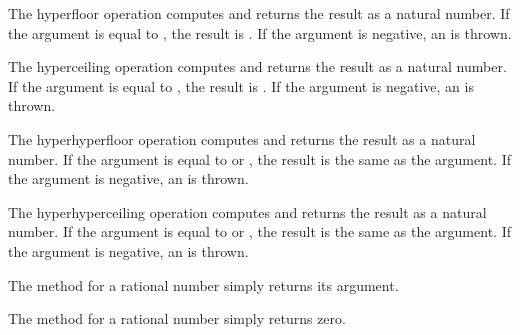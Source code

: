The hyperfloor operation  computes 
and returns the result as a natural number.
If the argument is equal to , the result is .
If the argument is negative, an  is thrown.

The hyperceiling operation  computes 
and returns the result as a natural number.
If the argument is equal to , the result is .
If the argument is negative, an  is thrown.

The hyperhyperfloor operation  computes 
and returns the result as a natural number.
If the argument is equal to  or , the result is the same as the argument.
If the argument is negative, an  is thrown.

The hyperhyperceiling operation  computes 
and returns the result as a natural number.
If the argument is equal to  or , the result is the same as the argument.
If the argument is negative, an  is thrown.



The method  for a rational number simply returns its argument.



The method  for a rational number simply returns zero.


